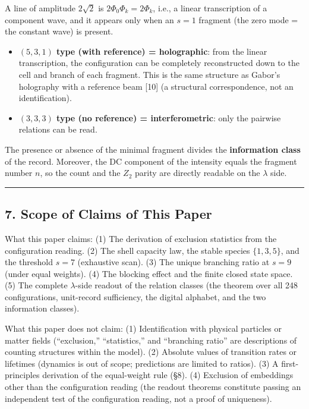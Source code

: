\documentclass[
]{article}
\providecommand{\tightlist}{%
  \setlength{\itemsep}{0pt}\setlength{\parskip}{0pt}}
\begin{document}
A line of amplitude \(2\sqrt2\) is \(2\Phi_0\Phi_k=2\Phi_k\), i.e., a
linear transcription of a component wave, and it appears only when an
\(s=1\) fragment (the zero mode = the constant wave) is present.

\begin{itemize}
\tightlist
\item
  \textbf{\((5,3,1)\) type (with reference) = holographic}: from the
  linear transcription, the configuration can be completely
  reconstructed down to the cell and branch of each fragment. This is
  the same structure as Gabor's holography with a reference beam
  {[}10{]} (a structural correspondence, not an identification).
\item
  \textbf{\((3,3,3)\) type (no reference) = interferometric}: only the
  pairwise relations can be read.
\end{itemize}

The presence or absence of the minimal fragment divides the
\textbf{information class} of the record. Moreover, the DC component of
the intensity equals the fragment number \(n\), so the count and the
\(Z_2\) parity are directly readable on the \(\lambda\) side.

\begin{center}\rule{0.5\linewidth}{0.5pt}\end{center}

\subsection{7. Scope of Claims of This
Paper}\label{scope-of-claims-of-this-paper}

What this paper claims: (1) The derivation of exclusion statistics from
the configuration reading. (2) The shell capacity law, the stable
species \(\{1,3,5\}\), and the threshold \(s=7\) (exhaustive scan). (3)
The unique branching ratio at \(s=9\) (under equal weights). (4) The
blocking effect and the finite closed state space. (5) The complete
\(\lambda\)-side readout of the relation classes (the theorem over all
248 configurations, unit-record sufficiency, the digital alphabet, and
the two information classes).

What this paper does not claim: (1) Identification with physical
particles or matter fields (``exclusion,'' ``statistics,'' and
``branching ratio'' are descriptions of counting structures within the
model). (2) Absolute values of transition rates or lifetimes (dynamics
is out of scope; predictions are limited to ratios). (3) A
first-principles derivation of the equal-weight rule (§8). (4) Exclusion
of embeddings other than the configuration reading (the readout theorems
constitute passing an independent test of the configuration reading, not
a proof of uniqueness).
\end{document}

